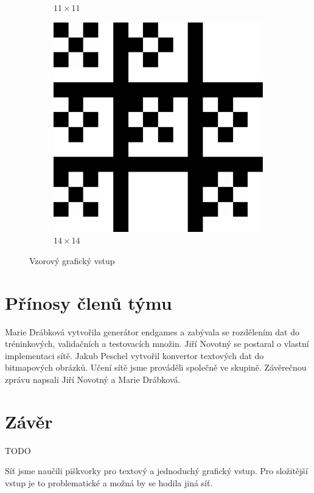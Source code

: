 \documentclass[10pt,a4paper]{article}
\begin{document}
\begin{figure}[h!]
\centering
\begin{subfigure}{.5\textwidth}
  \centering
  \caption{$11\times 11$}
  \label{fig:v1}
\end{subfigure}%
\begin{subfigure}{.5\textwidth}
  \centering
  \includegraphics[scale=0.2]{vzor14}
  \caption{$14\times 14$}
  \label{fig:v2}
\end{subfigure}
\caption{Vzorový grafický vstup}
\label{fig:v}
\end{figure}

\FloatBarrier
\section*{Přínosy členů týmu}
Marie Drábková vytvořila generátor endgames a zabývala se rozdělením dat do tréninkových, validačních a testovacích množin. 
Jiří Novotný se postaral o vlastní implementaci sítě.
Jakub Peschel vytvořil konvertor textových dat do bitmapových obrázků.
Učení sítě jsme prováděli společně ve skupině.
Závěrečnou zprávu napsali Jiří Novotný a Marie Drábková.

\section*{Závěr}
TODO

Síť jsme naučili piškvorky pro textový a jednoduchý grafický vstup. Pro složitější vstup je to problematické a možná by se hodila jiná síť.
\end{document}
